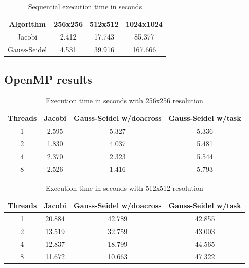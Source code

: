 \documentclass[titlepage]{article}
\begin{document}
\begin{table}[H]
\begin{center}
    \begin{tabular}{ |c|c|c|c| } 
     \hline
     \bfseries{Algorithm} &
     \bfseries{256x256} &
     \bfseries{512x512} &
     \bfseries{1024x1024} 
     \\
     \hline
      Jacobi & 2.412 & 17.743 &  85.377 \\
      Gauss-Seidel & 4.531 & 39.916 &  167.666 \\
     \hline
    \end{tabular}
\end{center}
\caption{Sequential execution time in seconds}
\end{table}

\subsection{OpenMP results}

\begin{table}[H]
\begin{center}
    \begin{tabular}{ |c|c|c|c| } 
     \hline
     \bfseries{Threads} & \bfseries{Jacobi} &
     \bfseries{Gauss-Seidel w/doacross} &
     \bfseries{Gauss-Seidel w/task} \\
     \hline
     1 & 2.595 & 5.327 & 5.336 \\
     2 & 1.830 & 4.037 & 5.481 \\ 
     4 & 2.370 & 2.323 & 5.544 \\ 
     8 & 2.526 & 1.416 & 5.793 \\ 
     \hline
    \end{tabular}
\end{center}
\caption{Execution time in seconds with 256x256 resolution}
\end{table}
 
\begin{table}[H]
\begin{center}
    \begin{tabular}{ |c|c|c|c| } 
     \hline
     \bfseries{Threads} & \bfseries{Jacobi} &
     \bfseries{Gauss-Seidel w/doacross} &
     \bfseries{Gauss-Seidel w/task} \\
     \hline
     1 & 20.884 & 42.789 & 42.855 \\
     2 & 13.519 & 32.759 & 43.003 \\ 
     4 & 12.837 & 18.799 & 44.565 \\ 
     8 & 11.672 & 10.663 & 47.322 \\ 
     \hline
    \end{tabular}
\end{center}
\caption{Execution time in seconds with 512x512 resolution}
\end{table}
\end{document}

